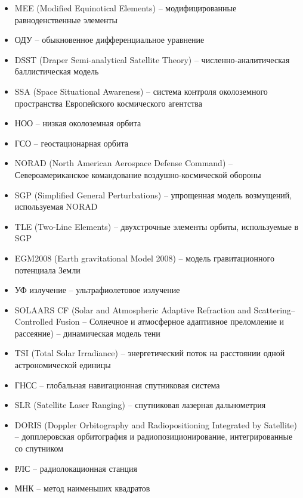 \begin{itemize}
    \item MEE (Modified Equinotical Elements) -- модифицированные равноденственные элементы
    \item ОДУ -- обыкновенное дифференциальное уравнение
    \item DSST (Draper Semi-analytical Satellite Theory) -- численно-аналитическая баллистическая модель
    \item SSA (Space Situational Awareness) -- система контроля околоземного пространства Европейского космического агентства
    \item НОО -- низкая околоземная орбита
    \item ГСО -- геостационарная орбита
    \item NORAD (North American Aerospace Defense Command) -- Североамериканское командование воздушно-космической обороны
    \item SGP (Simplified General Perturbations) -- упрощенная модель возмущений, используемая NORAD
    \item TLE (Two-Line Elements) -- двухстрочные элементы орбиты, используемые в SGP
    \item EGM2008 (Earth gravitational Model 2008) -- модель гравитационного потенциала Земли
    \item УФ излучение -- ультрафиолетовое излучение
    \item SOLAARS CF (Solar and Atmospheric Adaptive Refraction and Scattering–Controlled Fusion
    -- Солнечное и атмосферное адаптивное преломление и рассеяние) -- динамическая модель тени
    \item TSI (Total Solar Irradiance) -- энергетический поток на расстоянии одной астрономической единицы
    \item ГНСС -- глобальная навигационная спутниковая система
    \item SLR (Satellite Laser Ranging) -- спутниковая лазерная дальнометрия
    \item DORIS (Doppler Orbitography and Radiopositioning Integrated by Satellite) -- допплеровская орбитография и радиопозиционирование, интегрированные со спутником
    \item РЛС -- радиолокационная станция
    \item МНК -- метод наименьших квадратов
\end{itemize}

\newpage